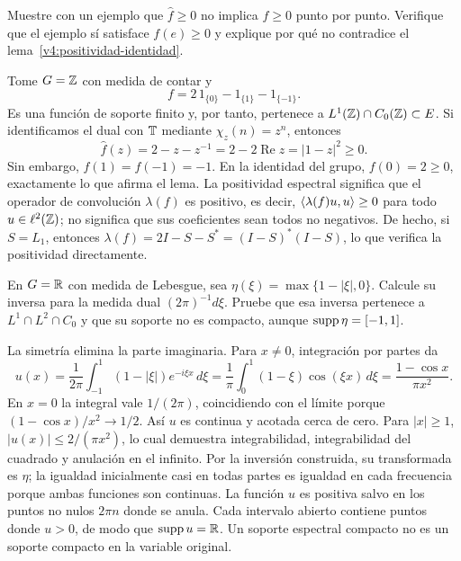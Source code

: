 \begin{ejercicio}\label{ej:v4-ampl-16-4}
Muestre con un ejemplo que $\widehat f\ge0$ no implica $f\ge0$ punto por punto. Verifique que el ejemplo sí satisface $f(e)\ge0$ y explique por qué no contradice el lema~\ref{v4:positividad-identidad}.
\end{ejercicio}
\begin{solucion}
Tome $G=\mathbb Z$ con medida de contar y
\[
 f=2\,1_{\{0\}}-1_{\{1\}}-1_{\{-1\}}.
\]
Es una función de soporte finito y, por tanto, pertenece a $L^1(\mathbb Z)\cap C_0(\mathbb Z)\subset E$. Si identificamos el dual con $\mathbb T$ mediante $\chi_z(n)=z^n$, entonces
\[
 \widehat f(z)=2-z-z^{-1}=2-2\operatorname{Re}z=|1-z|^2\ge0.
\]
Sin embargo, $f(1)=f(-1)=-1$. En la identidad del grupo, $f(0)=2\ge0$, exactamente lo que afirma el lema. La positividad espectral significa que el operador de convolución $\lambda(f)$ es positivo, es decir, $\left\langle\lambda(f)u,u\right\rangle\ge0$ para todo $u\in\ell^2(\mathbb Z)$; no significa que sus coeficientes sean todos no negativos. De hecho, si $S=L_1$, entonces $\lambda(f)=2I-S-S^*=(I-S)^*(I-S)$, lo que verifica la positividad directamente.
\end{solucion}

\begin{ejercicio}\label{ej:v4-ampl-16-5}
En $G=\mathbb R$ con medida de Lebesgue, sea $\eta(\xi)=\max\{1-|\xi|,0\}$. Calcule su inversa para la medida dual $(2\pi)^{-1}d\xi$. Pruebe que esa inversa pertenece a $L^1\cap L^2\cap C_0$ y que su soporte no es compacto, aunque $\operatorname{supp}\eta=[-1,1]$.
\end{ejercicio}
\begin{solucion}
La simetría elimina la parte imaginaria. Para $x\ne0$, integración por partes da
\[
 u(x)=\frac1{2\pi}\int_{-1}^1(1-|\xi|)e^{-i\xi x}\,d\xi
 =\frac1\pi\int_0^1(1-\xi)\cos(\xi x)\,d\xi
 =\frac{1-\cos x}{\pi x^2}.
\]
En $x=0$ la integral vale $1/(2\pi)$, coincidiendo con el límite porque $(1-\cos x)/x^2\to1/2$. Así $u$ es continua y acotada cerca de cero. Para $|x|\ge1$, $|u(x)|\le2/(\pi x^2)$, lo cual demuestra integrabilidad, integrabilidad del cuadrado y anulación en el infinito. Por la inversión construida, su transformada es $\eta$; la igualdad inicialmente casi en todas partes es igualdad en cada frecuencia porque ambas funciones son continuas. La función $u$ es positiva salvo en los puntos no nulos $2\pi n$ donde se anula. Cada intervalo abierto contiene puntos donde $u>0$, de modo que $\operatorname{supp} u=\mathbb R$. Un soporte espectral compacto no es un soporte compacto en la variable original.
\end{solucion}
